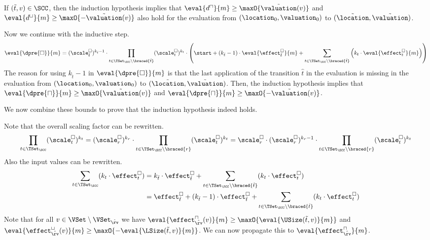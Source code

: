 If $(\tilde{t}, v) \in \SCC$, then the induction hypothesis implies that $\eval{d^\sqcap}{m} \geq \maxO{\tilde{\valuation}(v)}$ and $\eval{d^\sqcup}{m} \geq \maxO{-\tilde{\valuation}(v)}$ also hold for the evaluation from $(\location_0, \valuation_0)$ to $(\tilde{\location}, \tilde{\valuation})$.

Now we continue with the inductive step.
\begin{equation} \label{eq:induction_consequence}
  \eval{\dpre{\square}}{m} = (\scale^\square_{\hat{t}})^{k_{\hat{t}} - 1} \cdot \prod_{t \in \TSet_\SCC \setminus \braced{\hat{t}}} (\scale^\square_t)^{k_t} \cdot \left( \start + \left( k_{\hat{t}} - 1 \right) \cdot \eval{\effect^\square_{\hat{t}}}{m} + \sum_{t \in \TSet_\SCC \setminus \braced{\hat{t}}} \left( k_t \cdot \eval{\effect^\square_t}{m} \right) \right)
\end{equation}
The reason for using $k_{\hat{t}} - 1$ in $\eval{\dpre{\square}}{m}$ is that the last application of the transition $\hat{t}$ in the evaluation is missing in the evaluation from $(\location_0, \valuation_0)$ to $(\tilde{\location}, \tilde{\valuation})$.
Then, the induction hypothesis implies that $\eval{\dpre{\sqcap}}{m} \geq \maxO{\tilde{\valuation}(v)}$ and $\eval{\dpre{\sqcap}}{m} \geq \maxO{-\tilde{\valuation}(v)}$.

We now combine these bounds to prove that the induction hypothesis indeed holds.

Note that the overall scaling factor can be rewritten.
\begin{equation} \label{eq:scaling_factor_reduction}
  \prod_{t \in \TSet_\SCC} (\scale^\square_t)^{k_t} = (\scale^\square_r)^{k_r} \cdot \prod_{t \in \TSet_\SCC \setminus \braced{r}} (\scale^\square_t)^{k_t} = \scale^\square_r \cdot (\scale^\square_r)^{k_r - 1} \cdot \prod_{t \in \TSet_\SCC \setminus \braced{r}} (\scale^\square_t)^{k_t}
\end{equation}
Also the input values can be rewritten.
\begin{equation} \label{eq:input_reduction}
  \begin{split}
  \sum_{t \in \TSet_\SCC} (k_t \cdot \effect^\square_t)
  & = k_{\hat{t}} \cdot \effect^\square_{\hat{t}} + \sum_{t \in \TSet_\SCC \setminus \braced{\hat{t}}} (k_t \cdot \effect^\square_t) \\
  & = \effect^\square_{\hat{t}}
    + (k_{\hat{t}} - 1) \cdot \effect^\square_{\hat{t}}
    + \sum_{t \in \TSet_\SCC \setminus \braced{\hat{t}}} (k_t \cdot \effect^\square_t)
  \end{split}
\end{equation}
Note that for all $v \in \VSet \setminus \VSet_{\hat{\rv}}$ we have $\eval{\effect^\sqcap_{\hat{\rv}}(v)}{m} \geq \maxO{\eval{\USize(\tilde{t}, v)}{m}}$ and $\eval{\effect^\sqcup_{\hat{\rv}}(v)}{m} \geq \maxO{-\eval{\LSize(\tilde{t}, v)}{m}}$.
We can now propagate this to $\eval{\effect^\sqcap_{\hat{\rv}}}{m}$.

